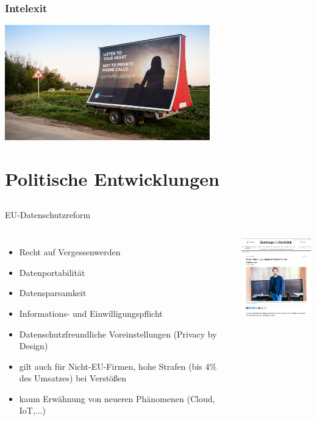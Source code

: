 \documentclass[12pt, xcolor={svgnames,table}]{beamer}
\begin{document}
\begin{frame}
  \frametitle{Intelexit}
    \begin{center}
      \includegraphics[height=5cm]{img/intelexit.jpg}
    \end{center}
\end{frame}

\section{Politische Entwicklungen}
\subsection{}


\begin{frame}{EU-Datenschutzreform}
  \begin{columns}
    \column{5.5cm}
    \footnotesize

    \begin{itemize}
      \item Recht auf Vergessenwerden
      \item Datenportabilität
      \item Datensparsamkeit
      \item Informations- und Einwilligungspflicht
      \item Datenschutzfreundliche Voreinstellungen (Privacy by Design)
      \item gilt auch für Nicht-EU-Firmen, hohe Strafen (bis 4\% des Umsatzes) bei Verstößen
      \item kaum Erwähnung von neueren Phänomenen (Cloud, IoT,...)
    \end{itemize}

    \column{5cm}

    \begin{center}
      \includegraphics[width=4.5cm]{img/datenschutz-eu.png}
    \par\end{center}
  \end{columns}
\end{frame}
\end{document}
